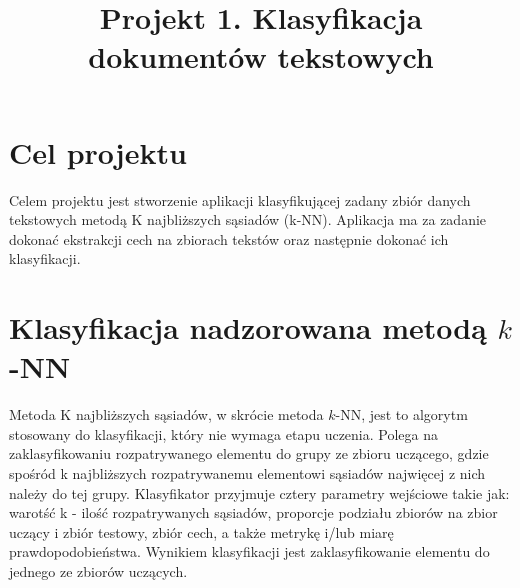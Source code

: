 \documentclass{classrep}
\author{
  \studentinfo{Julia Szymańska}{224441} \and
  \studentinfo{Przemysław Zdrzalik}{224466} }
\title{Projekt 1. Klasyfikacja dokumentów tekstowych}
\begin{document}
\maketitle


\section{Cel projektu}
Celem projektu jest stworzenie aplikacji klasyfikującej zadany zbiór danych tekstowych metodą K najbliższych sąsiadów (k-NN). Aplikacja ma za zadanie dokonać ekstrakcji cech na zbiorach tekstów\cite{dane} oraz następnie dokonać ich klasyfikacji.\\


\section{Klasyfikacja nadzorowana metodą $k$-NN}


Metoda K najbliższych sąsiadów, w skrócie metoda $k$-NN\cite{dane}, jest to algorytm stosowany do klasyfikacji, który nie wymaga etapu uczenia. 
Polega na zaklasyfikowaniu rozpatrywanego elementu do grupy ze zbioru uczącego, gdzie spośród k najbliższych rozpatrywanemu elementowi sąsiadów najwięcej z nich należy do tej grupy. Klasyfikator przyjmuje cztery parametry wejściowe takie jak: warotść k - ilość rozpatrywanych sąsiadów, proporcje podziału zbiorów na zbior uczący i zbiór testowy, zbiór cech, a także metrykę i/lub miarę prawdopodobieństwa. Wynikiem klasyfikacji jest zaklasyfikowanie elementu do jednego ze zbiorów uczących. 
\end{document}
